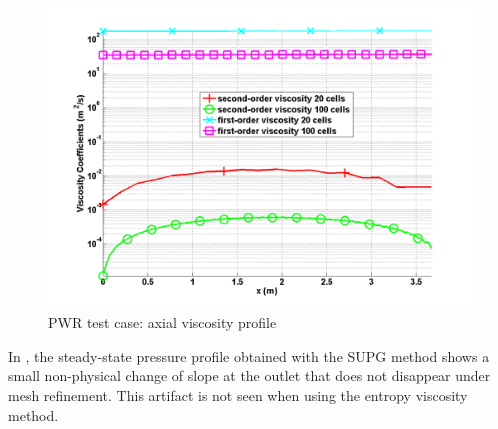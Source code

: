 \begin{figure}[ht]
\centering
\includegraphics[width=\textwidth]{figures/PWR_stt_viscosity.png}
\caption{PWR test case: axial viscosity profile}
\label{fig:Viscosity}
\end{figure}
%
In , the steady-state pressure profile obtained with the SUPG method shows a small non-physical change of slope at the outlet that does not disappear under mesh refinement. This artifact is not seen when using the entropy viscosity method. \\

